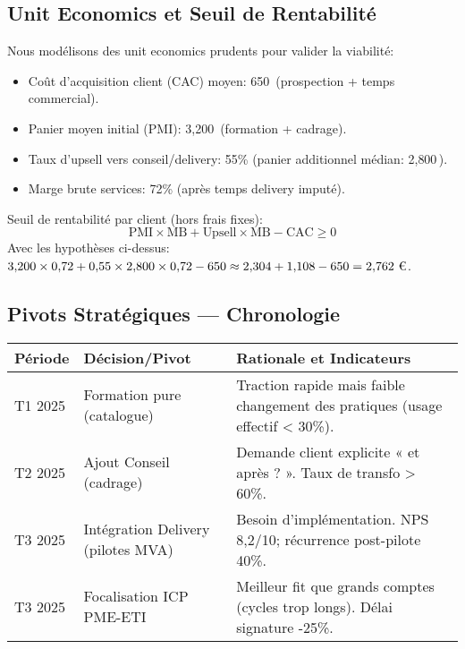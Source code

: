 \subsection{Unit Economics et Seuil de Rentabilité}
Nous modélisons des unit economics prudents pour valider la viabilité:
\begin{itemize}
    \item Coût d'acquisition client (CAC) moyen: 650\,\texteuro{} (prospection + temps commercial).
    \item Panier moyen initial (PMI): 3{,}200\,\texteuro{} (formation + cadrage).
    \item Taux d'upsell vers conseil/delivery: 55\% (panier additionnel médian: 2{,}800\,\texteuro{}).
    \item Marge brute services: 72\% (après temps delivery imputé).
\end{itemize}
Seuil de rentabilité par client (hors frais fixes):
\[
\text{PMI} \times \text{MB} + \text{Upsell} \times \text{MB} - \text{CAC} \ge 0
\]
Avec les hypothèses ci-dessus: $3{,}200 \times 0{,}72 + 0{,}55 \times 2{,}800 \times 0{,}72 - 650 \approx 2{,}304 + 1{,}108 - 650 = 2{,}762 \ \text{\texteuro}$.

\subsection{Pivots Stratégiques — Chronologie}
\begin{longtable}{@{}p{3cm}p{6cm}p{6cm}@{}}
\toprule
\textbf{Période} & \textbf{Décision/Pivot} & \textbf{Rationale et Indicateurs} \\
\midrule
T1 2025 & Formation pure (catalogue) & Traction rapide mais faible changement des pratiques (usage effectif \textless{} 30\%). \\
T2 2025 & Ajout Conseil (cadrage) & Demande client explicite « et après ? ». Taux de transfo \textgreater{} 60\%. \\
T3 2025 & Intégration Delivery (pilotes MVA) & Besoin d'implémentation. NPS 8{,}2/10; récurrence post-pilote 40\%. \\
T3 2025 & Focalisation ICP PME-ETI & Meilleur fit que grands comptes (cycles trop longs). Délai signature -25\%. \\
\bottomrule
\end{longtable}

